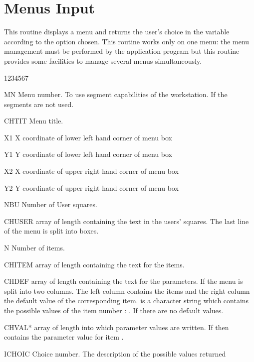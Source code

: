 \newpage
{}
\section{Menus Input}
\Action
This routine displays a menu and returns the user's choice in the variable
 according to the option chosen. This routine works only on one
menu: the menu management must be performed by the application program but this
routine provides some facilities to manage several menus simultaneously.
\Pdesc
\begin{DLtt}{1234567}
\item[MN] Menu number. To use segment capabilities of the workstation.
If  the segments are not used.
\item[CHTIT] Menu title.
\item[X1] X coordinate of lower left hand corner of menu box
\item[Y1] Y coordinate of lower left hand corner of menu box
\item[X2] X coordinate of upper right hand corner of menu box
\item[Y2] Y coordinate of upper right hand corner of menu box
\item[NBU] Number of User squares.
\item[CHUSER]  array of length 
containing the text in the users' squares.
The last line of the menu is split into  boxes.
\item[N] Number of items.
\item[CHITEM]  array of length 
containing the text for the items.
\item[CHDEF]  array of length 
containing the text for the parameters.
If  the menu is split into two columns.
The left column contains the items and
the right column the default value of the corresponding
item.
 is a character string which contains
the possible values of the item number :
.
If  there are no default values.
\item[CHVAL*]  array of length 
into which parameter values are written.
If  then  contains the
parameter value for item .
\item[ICHOIC] Choice number. The description of the possible values returned

\end{DLtt}
